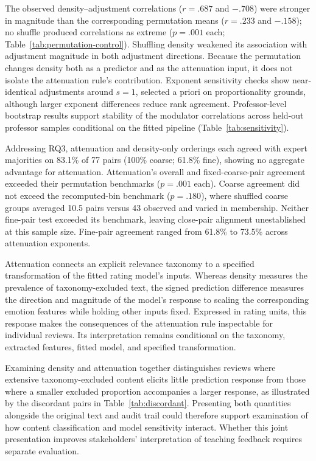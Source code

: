 \documentclass[fleqn,10pt]{JLA_article}
\begin{document}
The observed density--adjustment correlations ($r=.687$ and $-.708$) were stronger in magnitude than the corresponding permutation means ($r=.233$ and $-.158$); no shuffle produced correlations as extreme ($p=.001$ each; Table~\ref{tab:permutation-control}). Shuffling density weakened its association with adjustment magnitude in both adjustment directions. Because the permutation changes density both as a predictor and as the attenuation input, it does not isolate the attenuation rule's contribution. Exponent sensitivity checks show near-identical adjustments around $s=1$, selected a priori on proportionality grounds, although larger exponent differences reduce rank agreement. Professor-level bootstrap results support stability of the modulator correlations across held-out professor samples conditional on the fitted pipeline (Table~\ref{tab:sensitivity}).

Addressing RQ3, attenuation and density-only orderings each agreed with expert majorities on 83.1\% of 77 pairs (100\% coarse; 61.8\% fine), showing no aggregate advantage for attenuation. Attenuation's overall and fixed-coarse-pair agreement exceeded their permutation benchmarks ($p=.001$ each). Coarse agreement did not exceed the recomputed-bin benchmark ($p=.180$), where shuffled coarse groups averaged 10.5 pairs versus 43 observed and varied in membership. Neither fine-pair test exceeded its benchmark, leaving close-pair alignment unestablished at this sample size. Fine-pair agreement ranged from 61.8\% to 73.5\% across attenuation exponents.

Attenuation connects an explicit relevance taxonomy to a specified transformation of the fitted rating model's inputs. Whereas density measures the prevalence of taxonomy-excluded text, the signed prediction difference measures the direction and magnitude of the model's response to scaling the corresponding emotion features while holding other inputs fixed. Expressed in rating units, this response makes the consequences of the attenuation rule inspectable for individual reviews. Its interpretation remains conditional on the taxonomy, extracted features, fitted model, and specified transformation.

Examining density and attenuation together distinguishes reviews where extensive taxonomy-excluded content elicits little prediction response from those where a smaller excluded proportion accompanies a larger response, as illustrated by the discordant pairs in Table~\ref{tab:discordant}. Presenting both quantities alongside the original text and audit trail could therefore support examination of how content classification and model sensitivity interact. Whether this joint presentation improves stakeholders' interpretation of teaching feedback requires separate evaluation.
\end{document}
